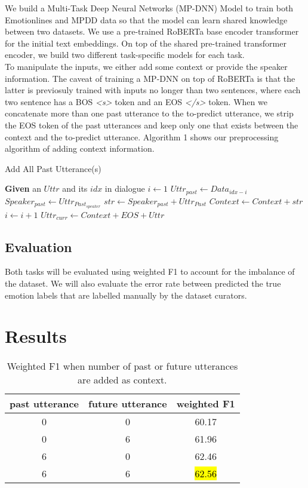 \documentclass[11pt]{article}
\begin{document}
We build a Multi-Task Deep Neural Networks (MP-DNN) Model \citet{liu-etal-2019-multi} to train both Emotionlines and MPDD data so that the model can learn shared knowledge between two datasets. We use a pre-trained RoBERTa base encoder transformer for the initial text embeddings. On top of the shared pre-trained transformer encoder, we build two different task-specific models for each task. \\
To manipulate the inputs, we either add some context or provide the speaker information. The caveat of training a MP-DNN on top of RoBERTa is that the latter is previosuly trained with inputs no longer than two sentences, where each two sentence has a BOS \textit{<s>} token and an EOS \textit{</s>} token. When we concatenate more than one past utterance to the to-predict utterance, we strip the EOS token of the past utterances and keep only one that exists between the context and the to-predict utterance. Algorithm 1 shows our preprocessing algorithm of adding context information.
\begin{algorithm}
\caption{Add All Past Utterance(s)}\label{euclid}
\begin{algorithmic}[1]
\State \textbf{Given} an $Uttr$ and its $idx$ in dialogue
    \State $i \gets 1$
        \State $Uttr_{past} \gets Data_{idx-i}$
        \State $Speaker_{past} \gets Uttr_{Past_{speaker}}$
        \State $str \gets Speaker_{past} + Uttr_{Past}$
        \State $Context \gets Context + str$
        \State $i \gets i + 1$
    \EndWhile
\EndIf
\State $Uttr_{curr} \gets Context + EOS + Uttr$
\end{algorithmic}
\end{algorithm}

\subsection{Evaluation}

Both tasks will be evaluated using weighted F1 to account for the imbalance of the dataset. We will also evaluate the error rate between predicted the true emotion labels that are labelled manually by the dataset curators. 


\section{Results}
\label{sec:results}

\begin{table}[hbt]
  \centering
  \begin{tabular}{c|c|c}
    past utterance & future utterance & weighted F1 \\
    \hline
    0 & 0 & 60.17 \\
    \hline
    0 & 6 & 61.96 \\
    \hline
    6 & 0 & 62.46 \\
    \hline
    6 & 6 & \hl{62.56} \\
  \end{tabular}
  \caption{Weighted F1 when number of past or future utterances are added as context.}
\end{table}
\end{document}
